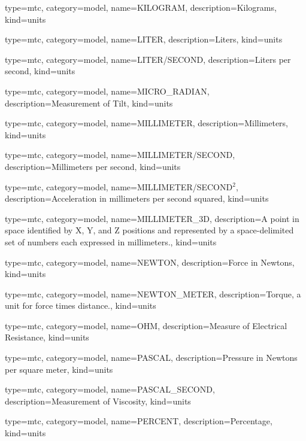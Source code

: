 {
  type=mtc,
  category=model,
  name={KILOGRAM},
  description={Kilograms},
  kind={units}
}


{
  type=mtc,
  category=model,
  name={LITER},
  description={Liters},
  kind={units}
}


{
  type=mtc,
  category=model,
  name={LITER/SECOND},
  description={Liters per second},
  kind={units}
}


{
  type=mtc,
  category=model,
  name={MICRO\_RADIAN},
  description={Measurement of Tilt},
  kind={units}
}


{
  type=mtc,
  category=model,
  name={MILLIMETER},
  description={Millimeters},
  kind={units}
}


{
  type=mtc,
  category=model,
  name={MILLIMETER/SECOND},
  description={Millimeters per second},
  kind={units}
}


{
  type=mtc,
  category=model,
  name={MILLIMETER/SECOND$^2$},
  description={Acceleration in millimeters per second squared},
  kind={units}
}


{
  type=mtc,
  category=model,
  name={MILLIMETER\_3D},
  description={A point in space identified by X, Y, and Z positions and represented by a space-delimited set of numbers each expressed in millimeters.},
  kind={units}
}


{
  type=mtc,
  category=model,
  name={NEWTON},
  description={Force in Newtons},
  kind={units}
}


{
  type=mtc,
  category=model,
  name={NEWTON\_METER},
  description={Torque, a unit for force times distance.},
  kind={units}
}


{
  type=mtc,
  category=model,
  name={OHM},
  description={Measure of Electrical Resistance},
  kind={units}
}


{
  type=mtc,
  category=model,
  name={PASCAL},
  description={Pressure in Newtons per square meter},
  kind={units}
}


{
  type=mtc,
  category=model,
  name={PASCAL\_SECOND},
  description={Measurement of Viscosity},
  kind={units}
}


{
  type=mtc,
  category=model,
  name={PERCENT},
  description={Percentage},
  kind={units}
}


